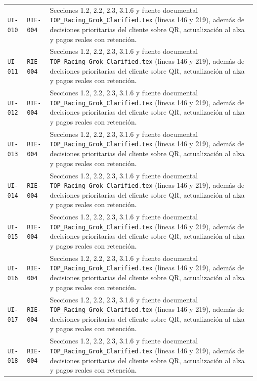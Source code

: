 \documentclass[10pt,letterpaper]{article}
\begin{document}
\begin{landscape}
\begin{longtable}{P{2.7cm}P{2.6cm}P{15.7cm}}
\texttt{UI-010} & \texttt{RIE-004} & Secciones 1.2, 2.2, 2.3, 3.1.6 y fuente documental \texttt{TOP\_Racing\_Grok\_Clarified.tex} (líneas 146 y 219), además de decisiones prioritarias del cliente sobre QR, actualización al alza y pagos reales con retención.\\
\texttt{UI-011} & \texttt{RIE-004} & Secciones 1.2, 2.2, 2.3, 3.1.6 y fuente documental \texttt{TOP\_Racing\_Grok\_Clarified.tex} (líneas 146 y 219), además de decisiones prioritarias del cliente sobre QR, actualización al alza y pagos reales con retención.\\
\texttt{UI-012} & \texttt{RIE-004} & Secciones 1.2, 2.2, 2.3, 3.1.6 y fuente documental \texttt{TOP\_Racing\_Grok\_Clarified.tex} (líneas 146 y 219), además de decisiones prioritarias del cliente sobre QR, actualización al alza y pagos reales con retención.\\
\texttt{UI-013} & \texttt{RIE-004} & Secciones 1.2, 2.2, 2.3, 3.1.6 y fuente documental \texttt{TOP\_Racing\_Grok\_Clarified.tex} (líneas 146 y 219), además de decisiones prioritarias del cliente sobre QR, actualización al alza y pagos reales con retención.\\
\texttt{UI-014} & \texttt{RIE-004} & Secciones 1.2, 2.2, 2.3, 3.1.6 y fuente documental \texttt{TOP\_Racing\_Grok\_Clarified.tex} (líneas 146 y 219), además de decisiones prioritarias del cliente sobre QR, actualización al alza y pagos reales con retención.\\
\texttt{UI-015} & \texttt{RIE-004} & Secciones 1.2, 2.2, 2.3, 3.1.6 y fuente documental \texttt{TOP\_Racing\_Grok\_Clarified.tex} (líneas 146 y 219), además de decisiones prioritarias del cliente sobre QR, actualización al alza y pagos reales con retención.\\
\texttt{UI-016} & \texttt{RIE-004} & Secciones 1.2, 2.2, 2.3, 3.1.6 y fuente documental \texttt{TOP\_Racing\_Grok\_Clarified.tex} (líneas 146 y 219), además de decisiones prioritarias del cliente sobre QR, actualización al alza y pagos reales con retención.\\
\texttt{UI-017} & \texttt{RIE-004} & Secciones 1.2, 2.2, 2.3, 3.1.6 y fuente documental \texttt{TOP\_Racing\_Grok\_Clarified.tex} (líneas 146 y 219), además de decisiones prioritarias del cliente sobre QR, actualización al alza y pagos reales con retención.\\
\texttt{UI-018} & \texttt{RIE-004} & Secciones 1.2, 2.2, 2.3, 3.1.6 y fuente documental \texttt{TOP\_Racing\_Grok\_Clarified.tex} (líneas 146 y 219), además de decisiones prioritarias del cliente sobre QR, actualización al alza y pagos reales con retención.\\

\end{longtable}
\end{landscape}
\end{document}
